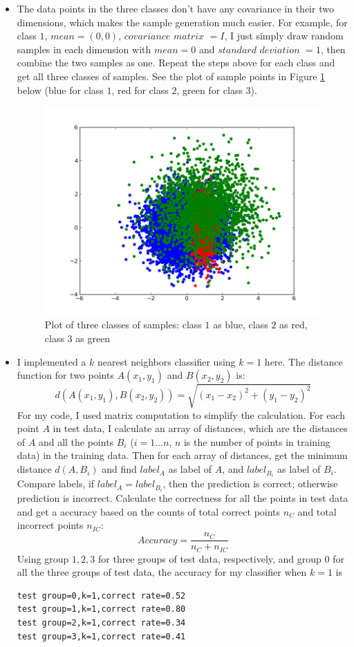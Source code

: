\begin{itemize}
\item The data points in the three classes don't have any covariance in their two dimensions, which makes the sample generation much easier. For example, for class $1$, $mean=(0,0)$, $covariance$ $matrix$ $= I$, I just simply draw random samples in each dimension with $mean = 0$ and $standard$ $deviation$ $= 1$, then combine the two samples as one. Repeat the steps above for each class and get all three classes of samples. See the plot of sample points in Figure \ref{three} below (blue for class $1$, red for class $2$, green for class $3$). 

\begin{figure}[htb]
\centering
\includegraphics[width=18cm]{hw5.png}
\caption{Plot of three classes of samples: class $1$ as blue, class $2$ as red, class $3$ as green }
\label{three}
\end{figure}

\item I implemented a $k$ nearest neighbors classifier using $k=1$ here. The distance function for two points $A(x_1,y_1)$ and $B(x_2,y_2)$ is:
\[
d(A(x_1,y_1),B(x_2,y_2))=\sqrt{(x_1-x_2)^2+(y_1-y_2)^2}
\]
For my code, I used matrix computation to simplify the calculation. For each point $A$ in test data, I calculate an array of distances, which are the distances of $A$ and all the points $B_i$ ($i=1...n$, $n$ is the number of points in training data) in the training data. Then for each array of distances, get the minimum distance $d(A,B_i)$ and find $label_A$ as label of $A$, and $label_{B_i}$ as label of $B_i$. Compare labels, if $label_A = label_{B_i}$, then the prediction is correct; otherwise prediction is incorrect. Calculate the correctness for all the points in test data and get a accuracy based on the counts of total correct points $n_C$ and total incorrect points $n_{IC}$:
\[
Accuracy = \frac{n_C}{n_C+n_{IC}}
\]
Using group $1,2,3$ for three groups of test data, respectively, and group $0$ for all the three groups of test data, the accuracy for my classifier when $k=1$ is 
\begin{verbatim}
test group=0,k=1,correct rate=0.52
test group=1,k=1,correct rate=0.80
test group=2,k=1,correct rate=0.34
test group=3,k=1,correct rate=0.41
\end{verbatim}



\end{itemize}
